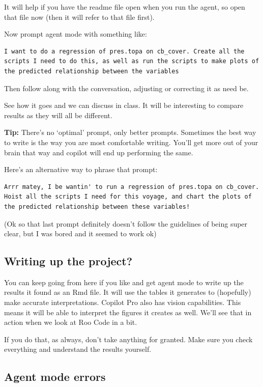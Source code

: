 \documentclass[
  letterpaper,
  DIV=11,
  numbers=noendperiod]{scrreprt}
\begin{document}
It will help if you have the readme file open when you run the agent, so
open that file now (then it will refer to that file first).

Now prompt agent mode with something like:

\begin{verbatim}
I want to do a regression of pres.topa on cb_cover. Create all the scripts I need to do this, as well as run the scripts to make plots of the predicted relationship between the variables
\end{verbatim}

Then follow along with the conversation, adjusting or correcting it as
need be.

See how it goes and we can discuss in class. It will be interesting to
compare results as they will all be different.

\textbf{Tip:} There's no `optimal' prompt, only better prompts.
Sometimes the best way to write is the way you are most comfortable
writing. You'll get more out of your brain that way and copilot will end
up performing the same.

Here's an alternative way to phrase that prompt:

\begin{verbatim}
Arrr matey, I be wantin' to run a regression of pres.topa on cb_cover. Hoist all the scripts I need for this voyage, and chart the plots of the predicted relationship between these variables!
\end{verbatim}

(Ok so that last prompt definitely doesn't follow the guidelines of
being super clear, but I was bored and it seemed to work ok)

\subsection{Writing up the project?}\label{writing-up-the-project}

You can keep going from here if you like and get agent mode to write up
the results it found as an Rmd file. It will use the tables it generates
to (hopefully) make accurate interpretations. Copilot Pro also has
vision capabilities. This means it will be able to interpret the figures
it creates as well. We'll see that in action when we look at Roo Code in
a bit.

If you do that, as always, don't take anything for granted. Make sure
you check everything and understand the results yourself.

\subsection{Agent mode errors}\label{agent-mode-errors}
\end{document}

